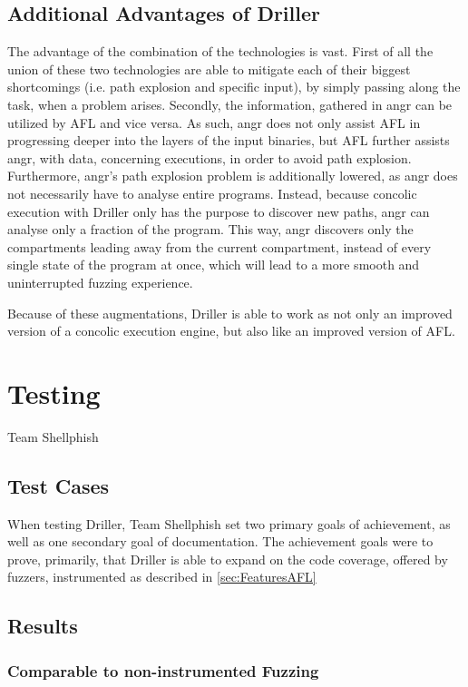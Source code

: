 \documentclass[a4paper]{article}
\begin{document}
\subsection{Additional Advantages of Driller}
\label{sec:DrillerAdditionalAdvantages}
The advantage of the combination of the technologies is vast. First of all the union of these two technologies are able to mitigate each of their biggest shortcomings (i.e. path explosion and specific input), by simply passing along the task, when a problem arises. Secondly, the information, gathered in angr can be utilized by AFL and vice versa. As such, angr does not only assist AFL in progressing deeper into the layers of the input binaries, but AFL further assists angr, with data, concerning executions, in order to avoid path explosion. Furthermore, angr's path explosion problem is additionally lowered, as angr does not necessarily have to analyse entire programs. Instead, because concolic execution with Driller only has the purpose to discover new paths, angr can analyse only a fraction of the program. This way, angr discovers only the compartments leading away from the current compartment, instead of every single state of the program at once, which will lead to a more smooth and uninterrupted fuzzing experience.

Because of these augmentations, Driller is able to work as not only an improved version of a concolic execution engine, but also like an improved version of AFL.
\section{Testing}
\label{sec:Testing}
Team Shellphish 
\subsection{Test Cases}
\label{sec:TestCases}
When testing Driller, Team Shellphish set two primary goals of achievement, as well as one secondary goal of documentation. The achievement goals were to prove, primarily, that Driller is able to expand on the code coverage, offered by fuzzers, instrumented as described in \ref{sec:FeaturesAFL}
\subsection{Results}
\label{sec:Results}
\subsubsection*{Comparable to non-instrumented Fuzzing}
\end{document}
